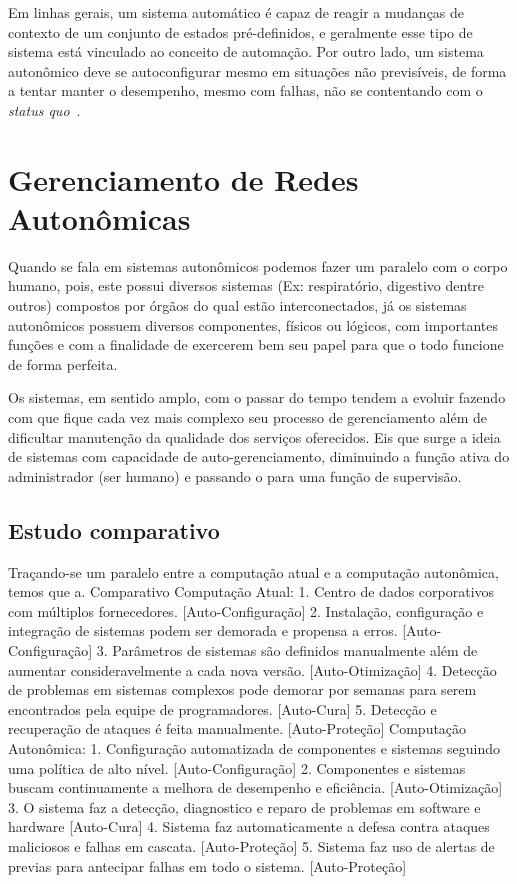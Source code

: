 \documentclass[11pt,twoside]{article}
\begin{document}
Em linhas gerais, um sistema automático é capaz de reagir a mudanças de contexto de um conjunto de estados pré-definidos, e geralmente esse tipo de sistema está vinculado ao conceito de automação. Por outro lado, um sistema autonômico deve se autoconfigurar mesmo em situações não previsíveis, de forma a tentar manter o desempenho, mesmo com falhas, não se contentando com o \textit{status quo}~\cite{GANEK}.

\section{Gerenciamento de Redes Autonômicas}
Quando se fala em sistemas autonômicos podemos fazer um paralelo com o corpo humano, pois, este possui diversos sistemas (Ex: respiratório, digestivo dentre outros) compostos por órgãos do qual estão interconectados, já os sistemas autonômicos possuem diversos componentes, físicos ou lógicos, com importantes funções e com a finalidade de exercerem bem seu papel para que o todo funcione de forma perfeita.

Os sistemas, em sentido amplo, com o passar do tempo tendem a evoluir fazendo com que fique cada vez mais complexo seu processo de gerenciamento além de dificultar manutenção da qualidade dos serviços oferecidos. Eis que surge a ideia de sistemas com capacidade de auto-gerenciamento, diminuindo a função ativa do administrador (ser humano) e passando o para uma função de supervisão.

\subsection{Estudo comparativo}
Traçando-se um paralelo entre a computação atual e a computação autonômica, temos que
a.	Comparativo
Computação Atual:
1.	Centro de dados corporativos com múltiplos fornecedores. [Auto-Configuração]
2.	Instalação, configuração e integração de sistemas podem ser demorada e propensa a erros. [Auto-Configuração]
3.	Parâmetros de sistemas são definidos manualmente além de aumentar consideravelmente a cada nova versão. [Auto-Otimização]
4.	Detecção de problemas em sistemas complexos pode demorar por semanas para serem encontrados pela equipe de programadores. [Auto-Cura]
5.	Detecção e recuperação de ataques é feita manualmente. [Auto-Proteção]
Computação Autonômica:
1.	Configuração automatizada de componentes e sistemas seguindo uma política de alto nível. [Auto-Configuração]
2.	Componentes e sistemas buscam continuamente a melhora de desempenho e eficiência. [Auto-Otimização]
3.	O sistema faz a detecção, diagnostico e reparo de problemas em software e hardware [Auto-Cura]
4.	Sistema faz automaticamente a defesa contra ataques maliciosos e falhas em cascata. [Auto-Proteção]
5.	Sistema faz uso de alertas de previas para antecipar falhas em todo o sistema. [Auto-Proteção]
\end{document}
